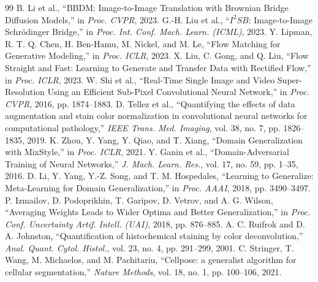 \documentclass[journal]{IEEEtran}
\begin{document}
\begin{thebibliography}{99}
 B. Li et al., ``BBDM: Image-to-Image Translation with Brownian Bridge Diffusion Models,'' in \textit{Proc. CVPR}, 2023.
 G.-H. Liu et al., ``$I^2SB$: Image-to-Image Schr\"odinger Bridge,'' in \textit{Proc. Int. Conf. Mach. Learn. (ICML)}, 2023.
 Y. Lipman, R. T. Q. Chen, H. Ben-Hamu, M. Nickel, and M. Le, ``Flow Matching for Generative Modeling,'' in \textit{Proc. ICLR}, 2023.
 X. Liu, C. Gong, and Q. Liu, ``Flow Straight and Fast: Learning to Generate and Transfer Data with Rectified Flow,'' in \textit{Proc. ICLR}, 2023.
 W. Shi et al., ``Real-Time Single Image and Video Super-Resolution Using an Efficient Sub-Pixel Convolutional Neural Network,'' in \textit{Proc. CVPR}, 2016, pp. 1874--1883.
 D. Tellez et al., ``Quantifying the effects of data augmentation and stain color normalization in convolutional neural networks for computational pathology,'' \textit{IEEE Trans. Med. Imaging}, vol. 38, no. 7, pp. 1826--1835, 2019.
 K. Zhou, Y. Yang, Y. Qiao, and T. Xiang, ``Domain Generalization with MixStyle,'' in \textit{Proc. ICLR}, 2021.
 Y. Ganin et al., ``Domain-Adversarial Training of Neural Networks,'' \textit{J. Mach. Learn. Res.}, vol. 17, no. 59, pp. 1--35, 2016.
 D. Li, Y. Yang, Y.-Z. Song, and T. M. Hospedales, ``Learning to Generalize: Meta-Learning for Domain Generalization,'' in \textit{Proc. AAAI}, 2018, pp. 3490--3497.
 P. Izmailov, D. Podoprikhin, T. Garipov, D. Vetrov, and A. G. Wilson, ``Averaging Weights Leads to Wider Optima and Better Generalization,'' in \textit{Proc. Conf. Uncertainty Artif. Intell. (UAI)}, 2018, pp. 876--885.
 A. C. Ruifrok and D. A. Johnston, ``Quantification of histochemical staining by color deconvolution,'' \textit{Anal. Quant. Cytol. Histol.}, vol. 23, no. 4, pp. 291--299, 2001.
 C. Stringer, T. Wang, M. Michaelos, and M. Pachitariu, ``Cellpose: a generalist algorithm for cellular segmentation,'' \textit{Nature Methods}, vol. 18, no. 1, pp. 100--106, 2021.
\end{thebibliography}
\end{document}
